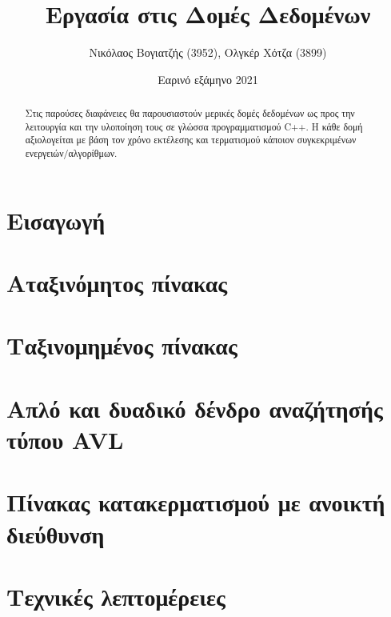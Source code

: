 



\title{Εργασία στις Δομές Δεδομένων}
\author{Νικόλαος Βογιατζής (3952), Ολγκέρ Χότζα (3899)}
\date{Εαρινό εξάμηνο 2021}

\maketitle

\begin{abstract}
    \begin{center}
        Στις παρούσες διαφάνειες θα παρουσιαστούν μερικές δομές δεδομένων ως προς την λειτουργία και την υλοποίηση τους σε γλώσσα προγραμματισμού C++. H κάθε δομή αξιολογείται με βάση τον χρόνο εκτέλεσης και τερματισμού κάποιον συγκεκριμένων ενεργειών/αλγορίθμων.
    \end{center}
\end{abstract}

\tableofcontents

\section{Εισαγωγή}

\section{Αταξινόμητος πίνακας}
 \clearpage
\section{Ταξινομημένος πίνακας}
 \clearpage
\section{Απλό και δυαδικό δένδρο αναζήτησής τύπου \en AVL \gr}
 \clearpage
\section{Πίνακας κατακερματισμού με ανοικτή διεύθυνση}
 \clearpage

\section*{Τεχνικές λεπτομέρειες}

